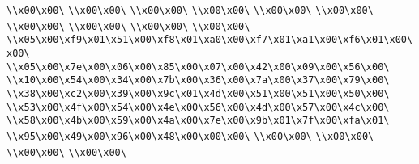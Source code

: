 \verb|\\x00\x00\|\newline
\verb|\\x00\x00\|\newline
\verb|\\x00\x00\|\newline
\verb|\\x00\x00\|\newline
\verb|\\x00\x00\|\newline
\verb|\\x00\x00\|\newline
\verb|\\x00\x00\|\newline
\verb|\\x00\x00\|\newline
\verb|\\x00\x00\|\newline
\verb|\\x00\x00\|\newline
\verb|\\x05\x00\xf9\x01\x51\x00\xf8\x01\xa0\x00\xf7\x01\xa1\x00\xf6\x01\x00\x00\|\newline
\verb|\\x05\x00\x7e\x00\x06\x00\x85\x00\x07\x00\x42\x00\x09\x00\x56\x00\|\newline
\verb|\\x10\x00\x54\x00\x34\x00\x7b\x00\x36\x00\x7a\x00\x37\x00\x79\x00\|\newline
\verb|\\x38\x00\xc2\x00\x39\x00\x9c\x01\x4d\x00\x51\x00\x51\x00\x50\x00\|\newline
\verb|\\x53\x00\x4f\x00\x54\x00\x4e\x00\x56\x00\x4d\x00\x57\x00\x4c\x00\|\newline
\verb|\\x58\x00\x4b\x00\x59\x00\x4a\x00\x7e\x00\x9b\x01\x7f\x00\xfa\x01\|\newline
\verb|\\x95\x00\x49\x00\x96\x00\x48\x00\x00\x00\|\newline
\verb|\\x00\x00\|\newline
\verb|\\x00\x00\|\newline
\verb|\\x00\x00\|\newline
\verb|\\x00\x00\|\newline

